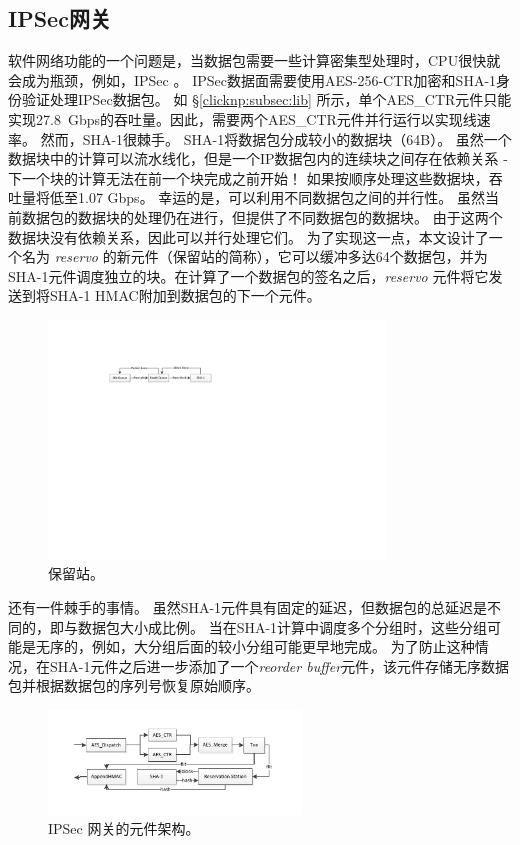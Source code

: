 \subsection{IPSec网关}
软件网络功能的一个问题是，当数据包需要一些计算密集型处理时，CPU很快就会成为瓶颈，例如，IPSec \cite {packetshader}。
IPSec数据面需要使用AES-256-CTR加密和SHA-1身份验证处理IPSec数据包。
如 \S \ref {clicknp:subsec:lib} 所示，单个AES\_CTR元件只能实现27.8~Gbps的吞吐量。因此，需要两个AES\_CTR元件并行运行以实现线速率。
然而，SHA-1很棘手。 SHA-1将数据包分成较小的数据块（64B）。
虽然一个数据块中的计算可以流水线化，但是一个IP数据包内的连续块之间存在依赖关系 - 下一个块的计算无法在前一个块完成之前开始！
如果按顺序处理这些数据块，吞吐量将低至1.07 Gbps。
幸运的是，可以利用不同数据包之间的并行性。
虽然当前数据包的数据块的处理仍在进行，但提供了不同数据包的数据块。
由于这两个数据块没有依赖关系，因此可以并行处理它们。
为了实现这一点，本文设计了一个名为 \textit {reservo} 的新元件（保留站的简称），它可以缓冲多达64个数据包，并为SHA-1元件调度独立的块。在计算了一个数据包的签名之后，\textit {reservo} 元件将它发送到将SHA-1 HMAC附加到数据包的下一个元件。



\begin{figure}[htbp]
	\centering
	\includegraphics[width=0.8\textwidth]{image/ReservationStation}
	\caption{保留站。}
	\label{clicknp:fig:reservo}
\end{figure}


还有一件棘手的事情。
虽然SHA-1元件具有固定的延迟，但数据包的总延迟是不同的，即与数据包大小成比例。
当在SHA-1计算中调度多个分组时，这些分组可能是无序的，例如，大分组后面的较小分组可能更早地完成。
为了防止这种情况，在SHA-1元件之后进一步添加了一个\textit {reorder buffer}元件，该元件存储无序数据包并根据数据包的序列号恢复原始顺序。


\begin{figure}[htbp]
	\centering
	\includegraphics[width=0.6\textwidth]{image/IPSec}
	\caption{IPSec 网关的元件架构。}
	\label{clicknp:fig:IPSec-arch}
\end{figure}



